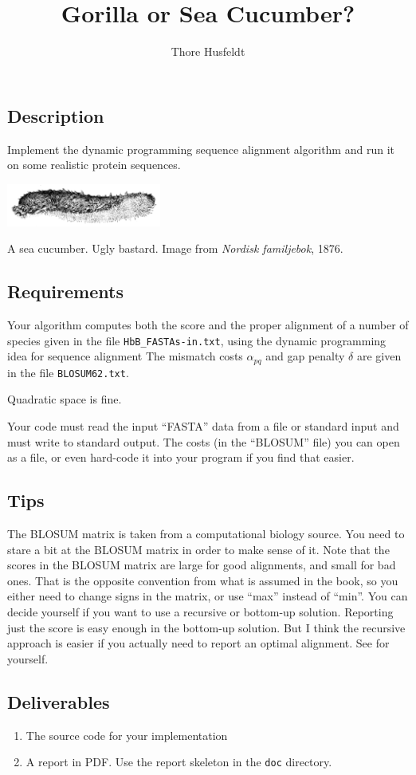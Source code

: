 \documentclass{tufte-handout}
\title{Gorilla or Sea Cucumber?}
\author{Thore Husfeldt}
\begin{document}
\maketitle

\subsection{Description}
Implement the dynamic programming sequence alignment algorithm and run it on some realistic protein sequences.

\begin{marginfigure}
  \includegraphics[width=2in]{sea_cucumber.png}
  \caption{A sea cucumber. Ugly bastard.
  Image from \emph{Nordisk familjebok}, 1876.}
\end{marginfigure}

\subsection{Requirements}

Your algorithm computes both the score and the proper alignment of a number of species given in the file \verb!HbB_FASTAs-in.txt!,
using the dynamic programming idea for sequence alignment
The mismatch costs $\alpha_{pq}$ and gap penalty $\delta$ are given in the file \verb!BLOSUM62.txt!.

Quadratic space is fine.

Your code must read the input ``FASTA'' data from a file or standard input and must write to standard output.
The costs (in the ``BLOSUM'' file) you can open as a file, or even hard-code it into your program if you find that easier.


\subsection{Tips}

The BLOSUM matrix is taken from a computational biology source.
You need to stare a bit at the BLOSUM matrix in order to make sense of it.
Note that the scores in the BLOSUM matrix are large for good alignments, and small for bad ones.
That is the opposite convention from what is assumed in the book, so you either need to change signs in the matrix, or use ``max'' instead of ``min''.
You can decide yourself if you want to use a recursive or bottom-up solution.
Reporting just the score is easy enough in the bottom-up solution.
But I think the recursive approach is easier if you actually need to report an optimal alignment.
See for yourself.


\subsection{Deliverables}

\begin{enumerate}
  \item The source code for your implementation
  \item A report in PDF.
  Use the report skeleton in the {\tt doc} directory.
  \end{enumerate}
\end{document}
